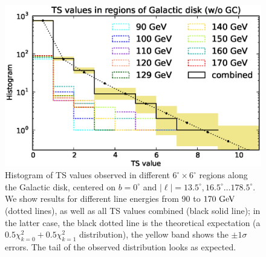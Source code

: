 \documentclass[aps,twocolumn,prd,superscriptaddress,showpacs,nofootinbib,fixfloat]{revtex4}
\newcommand{\GeV}{{\rm ~GeV}}
\begin{document}
\begin{figure}
  \begin{center}
    \includegraphics[width=1.0\linewidth]{plots/hotspot_histogram.eps}
  \end{center}
  \caption{Histogram of TS values observed in different
  $6^\circ\times6^\circ$ regions along the Galactic disk, centered on $b=0^\circ$ and
  $|\ell|=13.5^\circ, 16.5^\circ \dots 178.5^\circ$. We show results for
  different line energies from 90 to $170\GeV$ (dotted lines), as well as all
  TS values combined (black solid line); in the latter case, the black dotted
  line is the theoretical expectation (a $0.5\chi^2_{k=0}+0.5\chi^2_{k=1}$
  distribution), the yellow band shows the $\pm1\sigma$ errors. The tail of the
  observed distribution looks as expected.}
  \label{fig:hotspots}
\end{figure}
\end{document}
